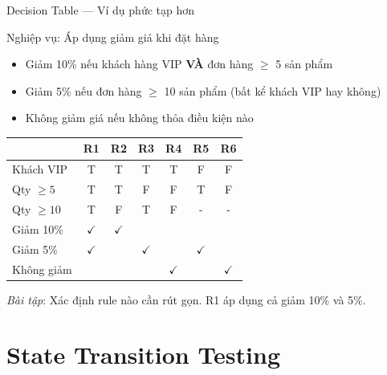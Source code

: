 \documentclass[aspectratio=169,12pt]{beamer}
\begin{document}
\begin{frame}[shrink=10]{Decision Table --- Ví dụ phức tạp hơn}
  \begin{block}{Nghiệp vụ: Áp dụng giảm giá khi đặt hàng}
    \begin{itemize}
      \item Giảm 10\% nếu khách hàng VIP \textbf{VÀ} đơn hàng $\geq$ 5 sản phẩm
      \item Giảm 5\% nếu đơn hàng $\geq$ 10 sản phẩm (bất kể khách VIP hay không)
      \item Không giảm giá nếu không thỏa điều kiện nào
    \end{itemize}
  \end{block}

  \vspace{0.15em}
  \begin{center}
  \scriptsize
  \setlength{\tabcolsep}{4pt}
  \begin{tabular}{lcccccc}
    \toprule
    & R1 & R2 & R3 & R4 & R5 & R6 \\
    \midrule
    Khách VIP    & T & T & T & T & F & F \\
    Qty $\geq 5$ & T & T & F & F & T & F \\
    Qty $\geq 10$& T & F & T & F & - & - \\
    \midrule
    Giảm 10\%    & $\checkmark$ & $\checkmark$ & & & & \\
    Giảm 5\%     & $\checkmark$ & & $\checkmark$ & & $\checkmark$ & \\
    Không giảm   & & & & $\checkmark$ & & $\checkmark$ \\
    \bottomrule
  \end{tabular}
  \end{center}

  \vspace{0.05em}
  {\scriptsize \textit{Bài tập}: Xác định rule nào cần rút gọn. R1 áp dụng cả giảm 10\% và 5\%.}
\end{frame}

\section{State Transition Testing}
\end{document}
